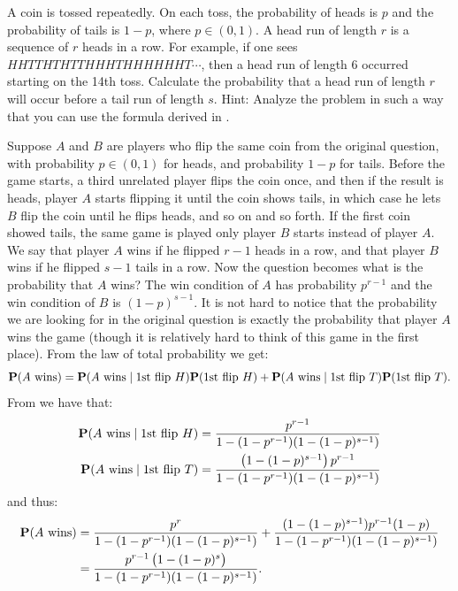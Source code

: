 \documentclass[11pt,a4paper]{article}
\begin{document}
\begin{exercise}
  \label{ex:one-seven}
  A coin is tossed repeatedly.
  On each toss, the probability of heads is $p$ and the probability of tails
  is $1 - p$, where $p \in (0,1)$.
  A head run of length $r$ is a sequence of $r$ heads in a row.
  For example, if one sees $HHTTHTHTTHHHTHHHHHHT\cdots$,
  then a head run of length $6$ occurred starting on the 14th toss.
  Calculate the probability that a head run of length $r$ will occur before
  a tail run of length $s$.
  Hint: Analyze the problem in such a way that you can use the formula
  derived in .
\end{exercise}
\begin{solution}
  Suppose $A$ and $B$ are players who flip the same coin from the original
  question, with probability $p \in (0,1)$ for heads, and probability
  $1 - p$ for tails.
  Before the game starts, a third unrelated player flips the coin once,
  and then if the result is heads,
  player $A$ starts flipping it until the coin shows tails,
  in which case he lets $B$ flip the coin until he flips heads,
  and so on and so forth.
  If the first coin showed tails, the same game is played only player $B$
  starts instead of player $A$.
  We say that player $A$ wins if he flipped $r - 1$ heads in a row,
  and that player $B$ wins if he flipped $s - 1$ tails in a row.
  Now the question becomes what is the probability that $A$ wins?
  The win condition of $A$ has probability $p^{r-1}$ and the win
  condition of $B$ is $(1-p)^{s-1}$.
  It is not hard to notice that the probability we are looking
  for in the original question is exactly the probability that player $A$
  wins the game (though it is relatively hard to think of this game
  in the first place).
  From the law of total probability we get:
  \[
    \mathbf{P}(A \text{ wins}) =
    \mathbf{P}(A \text{ wins} \mid \text{$1$st flip } H) \mathbf{P}(\text{$1$st flip } H) +
    \mathbf{P}(A \text{ wins} \mid \text{$1$st flip } T) \mathbf{P}(\text{$1$st flip } T).
  \]
  From  we have that:
  \begin{align*}
    \Prob(A \text{ wins} \mid \text{$1$st flip }H) &=
    \frac{p^{r-1}}{1 - (1 - p^{r-1}) (1 - (1-p)^{s-1})} \\
    \Prob(A \text{ wins} \mid \text{$1$st flip }T) &=
    \frac{\del{1 - (1-p)^{s-1}} p^{r-1}}{1 - (1 - p^{r-1}) (1 - (1-p)^{s-1})}
  \end{align*}
  and thus:
  \begin{align*}
    \Prob(A \text{ wins}) &=
    \frac{p^{r}}{1 - (1 - p^{r-1}) (1 - (1-p)^{s-1})} +
    \frac{(1 - (1-p)^{s-1}) p^{r-1} (1 - p)}{1 - (1 - p^{r-1}) (1 - (1-p)^{s-1})} \\ &=
    \frac{p^{r - 1} \del{1 - (1-p)^s}}{1 - (1 - p^{r-1}) (1 - (1-p)^{s-1})}.
  \end{align*}
\end{solution}
\end{document}
